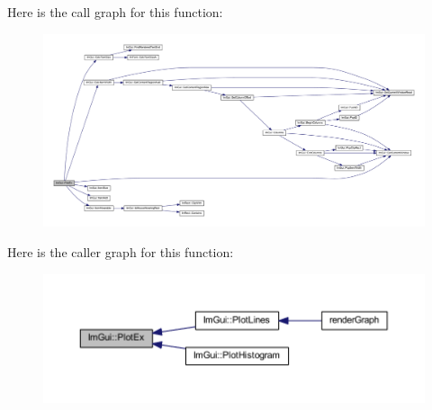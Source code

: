 Here is the call graph for this function\+:
\nopagebreak
\begin{figure}[H]
\begin{center}
\leavevmode
\includegraphics[width=350pt]{namespace_im_gui_a0a18ae07b294d5667f95a5c003d2efb6_cgraph}
\end{center}
\end{figure}
Here is the caller graph for this function\+:
\nopagebreak
\begin{figure}[H]
\begin{center}
\leavevmode
\includegraphics[width=350pt]{namespace_im_gui_a0a18ae07b294d5667f95a5c003d2efb6_icgraph}
\end{center}
\end{figure}
\mbox{\label{namespace_im_gui_af7a92b2118981835b5251bfdaac50252}} 
